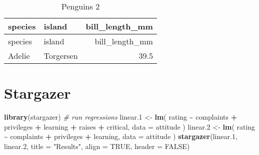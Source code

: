 \documentclass[
]{article}
\newenvironment{Shaded}{\begin{snugshade}}{\end{snugshade}}
\newcommand{\AttributeTok}[1]{\textcolor[rgb]{0.13,0.29,0.53}{#1}}
\newcommand{\CommentTok}[1]{\textcolor[rgb]{0.56,0.35,0.01}{\textit{#1}}}
\newcommand{\ConstantTok}[1]{\textcolor[rgb]{0.56,0.35,0.01}{#1}}
\newcommand{\FloatTok}[1]{\textcolor[rgb]{0.00,0.00,0.81}{#1}}
\newcommand{\FunctionTok}[1]{\textcolor[rgb]{0.13,0.29,0.53}{\textbf{#1}}}
\newcommand{\NormalTok}[1]{#1}
\newcommand{\OtherTok}[1]{\textcolor[rgb]{0.56,0.35,0.01}{#1}}
\newcommand{\SpecialCharTok}[1]{\textcolor[rgb]{0.81,0.36,0.00}{\textbf{#1}}}
\newcommand{\StringTok}[1]{\textcolor[rgb]{0.31,0.60,0.02}{#1}}
\begin{document}
\vspace{10mm}

\begin{longtable}[]{@{}llr@{}}
\caption{Penguins 2}\tabularnewline
\toprule\noalign{}
species & island & bill\_length\_mm \\
\midrule\noalign{}
\endfirsthead
\toprule\noalign{}
species & island & bill\_length\_mm \\
\midrule\noalign{}
\endhead
\bottomrule\noalign{}
\endlastfoot
Adelie & Torgersen & 39.5 \\
\end{longtable}

\vspace{10mm}

\section{Stargazer}\label{stargazer}

\begin{Shaded}
\begin{Highlighting}[]
\FunctionTok{library}\NormalTok{(stargazer)}
\CommentTok{\# run regressions}
\NormalTok{linear}\FloatTok{.1} \OtherTok{\textless{}{-}} \FunctionTok{lm}\NormalTok{(}
\NormalTok{  rating }\SpecialCharTok{\textasciitilde{}}\NormalTok{ complaints }\SpecialCharTok{+}\NormalTok{ privileges }\SpecialCharTok{+}\NormalTok{ learning }\SpecialCharTok{+}\NormalTok{ raises }\SpecialCharTok{+}\NormalTok{ critical,}
  \AttributeTok{data =}\NormalTok{ attitude}
\NormalTok{)}
\NormalTok{linear}\FloatTok{.2} \OtherTok{\textless{}{-}} \FunctionTok{lm}\NormalTok{(}
\NormalTok{  rating }\SpecialCharTok{\textasciitilde{}}\NormalTok{ complaints }\SpecialCharTok{+}\NormalTok{ privileges }\SpecialCharTok{+}\NormalTok{ learning, }\AttributeTok{data =}\NormalTok{ attitude}
\NormalTok{)}
\FunctionTok{stargazer}\NormalTok{(linear}\FloatTok{.1}\NormalTok{, linear}\FloatTok{.2}\NormalTok{, }\AttributeTok{title =} \StringTok{"Results"}\NormalTok{, }\AttributeTok{align =} \ConstantTok{TRUE}\NormalTok{, }\AttributeTok{header =} \ConstantTok{FALSE}\NormalTok{)}
\end{Highlighting}
\end{Shaded}
\end{document}
